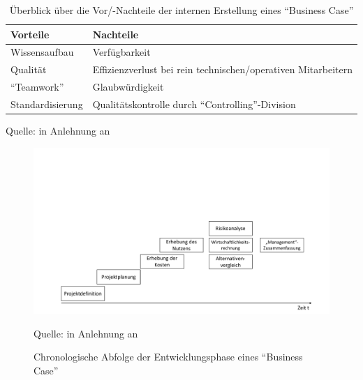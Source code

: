 \begin{table}[h!]
	\centering
	
	\begin{tabular}{@{}ll@{}}\toprule[1.5pt]
		
		\textbf{Vorteile} & \textbf{Nachteile} \\ \midrule
		
		Wissensaufbau & Verfügbarkeit \\
		Qualität & Effizienzverlust bei rein technischen/operativen Mitarbeitern \\
		\enquote{Teamwork} & Glaubwürdigkeit \\
		Standardisierung & Qualitätskontrolle durch \enquote{Controlling}-Division \\
		
		\bottomrule[1.5pt]
	\end{tabular}
	
	\caption{Überblick über die Vor/-Nachteile der internen Erstellung eines \enquote{Business Case}}
	{\footnotesize Quelle: in Anlehnung an \cite[][S.34]{brugger_it_2009}}
	\label{tab:internVorNachteile}
	
\end{table}

\begin{figure}[H]
	\centering
	\includegraphics[scale=0.48]{img/chronoBC.pdf}
	\caption{Chronologische Abfolge der Entwicklungsphase eines \enquote{Business Case}}
	{\footnotesize Quelle: in Anlehnung an \cite[][]{herman_is_2009}}
	\label{abb:entwicklungBC}
\end{figure}

